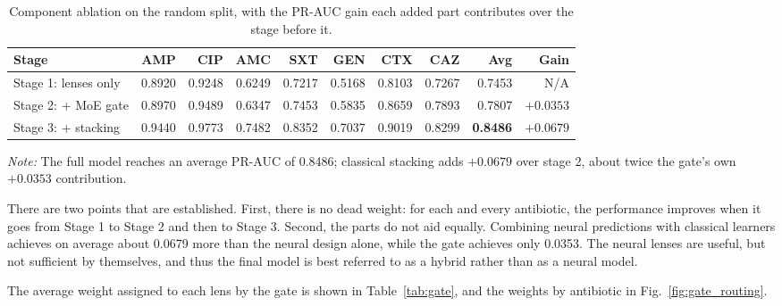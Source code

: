 \documentclass[journal]{IEEEtran}
\begin{document}
\begin{table}[!tb]
\caption{Component ablation on the random split, with the PR-AUC gain each added part
contributes over the stage before it.}
\label{tab:ablation}
\centering
\small
\setlength{\tabcolsep}{5pt}
\renewcommand{\arraystretch}{1.05}
\begin{tabular}{|l|r|r|r|r|r|r|r|r|r|}
\hline
\rowcolor{headgrey}
\textbf{Stage} & \textbf{AMP} & \textbf{CIP} & \textbf{AMC} & \textbf{SXT} & \textbf{GEN} & \textbf{CTX} & \textbf{CAZ} & \textbf{Avg} & \textbf{Gain} \\ \hline
Stage 1: lenses only    & 0.8920 & 0.9248 & 0.6249 & 0.7217 & 0.5168 & 0.8103 & 0.7267 & 0.7453 & N/A \\ \hline
Stage 2: + MoE gate     & 0.8970 & 0.9489 & 0.6347 & 0.7453 & 0.5835 & 0.8659 & 0.7893 & 0.7807 & $+0.0353$ \\ \hline
\rowcolor{oursblue}
Stage 3: + stacking     & 0.9440 & 0.9773 & 0.7482 & 0.8352 & 0.7037 & 0.9019 & 0.8299 & \textbf{0.8486} & \textbf{$+0.0679$} \\ \hline
\end{tabular}
\renewcommand{\arraystretch}{1.0}
\vspace{0.4em}

\noindent\footnotesize\textit{Note:} The full model reaches an average PR-AUC of 0.8486;
classical stacking adds $+0.0679$ over stage 2, about twice the gate's own $+0.0353$ contribution.
\end{table}

There are two points that are established. First, there is no dead weight: for each
and every antibiotic, the performance improves when it goes from Stage 1 to Stage 2
and then to Stage 3. Second, the parts do not aid equally. Combining neural
predictions with classical learners achieves on average about 0.0679 more than the
neural design alone, while the gate achieves only 0.0353. The neural lenses are
useful, but not sufficient by themselves, and thus the final model is best referred
to as a hybrid rather than as a neural model.

The average weight assigned to each lens by the gate is shown in
Table~\ref{tab:gate}, and the weights by antibiotic in
Fig.~\ref{fig:gate_routing}.
\end{document}
